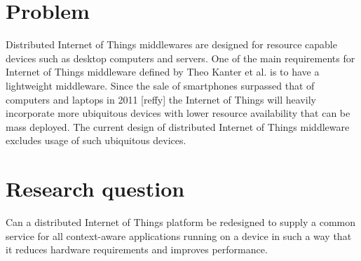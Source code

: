 \section{Problem}
Distributed Internet of Things middlewares are designed for resource capable devices such as desktop computers and servers. One of the main requirements for Internet of Things middleware defined by Theo Kanter et al. \cite{Kanter539187} is to have a lightweight middleware. Since the sale of smartphones surpassed that of computers and laptops in 2011 [reffy] the Internet of Things will heavily incorporate more ubiquitous devices with lower resource availability that can be mass deployed. The current design of distributed Internet of Things middleware excludes usage of such ubiquitous devices.

\section{Research question}
Can a distributed Internet of Things platform be redesigned to supply a common service for all context-aware applications running on a device in such a way that it reduces hardware requirements and improves performance. 